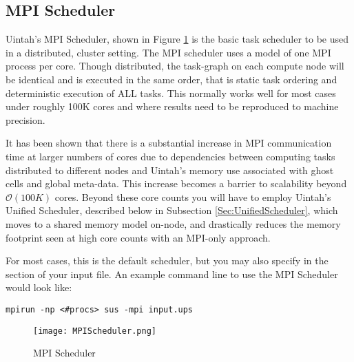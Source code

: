 \subsection{MPI Scheduler} \label{Sec:MPIScheduler}
Uintah's MPI Scheduler, shown in Figure \ref{fig:MPIScheduler} is the basic
task scheduler to be used in a distributed, cluster setting. The MPI scheduler
uses a model of one MPI process per core. Though distributed, the task-graph on
each compute node will be identical and is executed in the same order, that is
static task ordering and deterministic execution of ALL tasks. This normally
works well for most cases under roughly 100K cores and where results need to be
reproduced to machine precision.

It has been shown that there is a substantial increase in MPI communication
time at larger numbers of cores due to dependencies between computing tasks
distributed to different nodes and Uintah's memory use associated with ghost
cells and global meta-data. This increase becomes a barrier to scalability
beyond $\mathcal{O}(100K)$ cores. Beyond these core counts you will have to
employ Uintah's Unified Scheduler, described below in Subsection
\ref{Sec:UnifiedScheduler}, which moves to a shared memory model on-node, and
drastically reduces the memory footprint seen at high core counts with an
MPI-only approach.

For most cases, this is the default scheduler, but you may also specify
 in the  section of your input file. An example
command line to use the MPI Scheduler would look like:

\begin{Verbatim}[fontsize=\footnotesize]
mpirun -np <#procs> sus -mpi input.ups
\end{Verbatim}

\begin{figure}[H]
  \centering
  \texttt{[image: MPIScheduler.png]}
  \caption{MPI Scheduler}
  \label{fig:MPIScheduler}
\end{figure}


